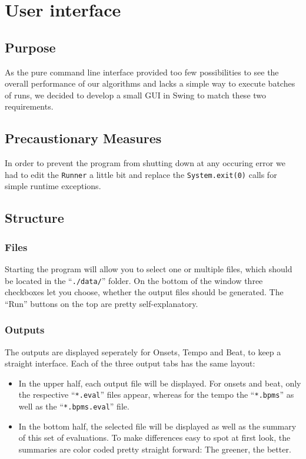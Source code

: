 \chapter{User interface} \label{cpt:gui}

\section{Purpose}
As the pure command line interface provided too few possibilities to see the
overall performance of our algorithms and lacks a simple way to execute
batches of runs, we decided to develop a small GUI in Swing to match these two
requirements.

\section{Precaustionary Measures}
In order to prevent the program from shutting down at any occuring error we had
to edit the \texttt{Runner} a little bit and replace the
\texttt{System.exit(0)} calls for simple runtime exceptions.

\section{Structure}
\subsection{Files}
Starting the program will allow you to select one or multiple files, which
should be located in the ``\texttt{./data/}'' folder. On the bottom of the
window three checkboxes let you choose, whether the output files should be
generated. The ``Run'' buttons on the top are pretty self-explanatory.

\subsection{Outputs}
The outputs are displayed seperately for Onsets, Tempo and Beat, to keep a
straight interface. Each of the three output tabs has the same layout:

\begin{itemize}
  \item In the upper half, each output file will be displayed. For onsets and
  beat, only the respective ``\texttt{*.eval}'' files appear, whereas for the
  tempo the ``\texttt{*.bpms}'' as well as the ``\texttt{*.bpms.eval}'' file.
  \item In the bottom half, the selected file will be displayed as well as the
  summary of this set of evaluations. To make differences easy to spot at first
  look, the summaries are color coded pretty straight forward: The greener, the
  better.
\end{itemize}
